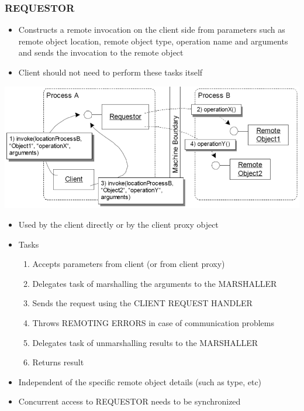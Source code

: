 \documentclass[10pt]{article}
\begin{document}
\subsubsection{REQUESTOR}
\begin{itemize}
	\item Constructs a remote invocation on the client side from parameters such as remote object location, remote object type, operation name and arguments and sends the invocation to the remote object
	\item Client should not need to perform these tasks itself
\end{itemize}
\begin{center}
	\includegraphics[scale=0.2]{images/requestor.png}
\end{center}
\begin{itemize}
	\item Used by the client directly or by the client proxy object
	\item Tasks
		\begin{enumerate}
			\item Accepts parameters from client (or from client proxy)
			\item Delegates task of marshalling the arguments to the MARSHALLER
			\item Sends the request using the CLIENT REQUEST HANDLER
			\item Throws REMOTING ERRORS in case of communication problems
			\item Delegates task of unmarshalling results to the MARSHALLER
			\item Returns result
		\end{enumerate}
	\item  Independent of the specific remote object details (such as type, etc)
	\item Concurrent access to REQUESTOR needs to be synchronized
\end{itemize}
\end{document}
